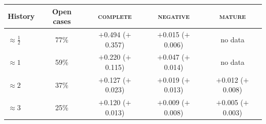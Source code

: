 \begin{tabular}{lcccc}
\toprule
History & Open cases & \textsc{complete} & \textsc{negative} & \textsc{mature} \\
\midrule
$\approx\frac12$ & 77\% & $+$0.494 ($+$0.357) & $+$0.015 ($+$0.006) & no data \\
$\approx 1$ & 59\% & $+$0.220 ($+$0.115) & $+$0.047 ($+$0.014) & no data \\
$\approx 2$ & 37\% & $+$0.127 ($+$0.023) & $+$0.019 ($+$0.013) & $+$0.012 ($+$0.008) \\
$\approx 3$ & 25\% & $+$0.120 ($+$0.013) & $+$0.009 ($+$0.008) & $+$0.005 ($+$0.003) \\
\bottomrule
\end{tabular}
